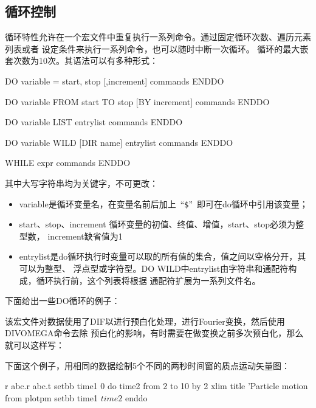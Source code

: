 \subsection{循环控制}
循环特性允许在一个宏文件中重复执行一系列命令。通过固定循环次数、遍历元素列表或者
设定条件来执行一系列命令，也可以随时中断一次循环。
循环的最大嵌套次数为10次。其语法可以有多种形式：
\begin{SACCode}
DO variable = start, stop [,increment]
    commands
ENDDO
\end{SACCode}

\begin{SACCode}
DO variable FROM start TO stop [BY increment]
    commands
ENDDO
\end{SACCode}

\begin{SACCode}
DO variable LIST entrylist
    commands
ENDDO
\end{SACCode}

\begin{SACCode}
DO variable WILD [DIR name] entrylist
    commands
ENDDO
\end{SACCode}

\begin{SACCode}
WHILE expr
    commands
ENDDO
\end{SACCode}
其中大写字符串均为关键字，不可更改：
\begin{itemize}
\item variable是循环变量名，在变量名前后加上~``\lstinline{$}''~即可在do循环中引用该变量；
\item start、stop、increment 循环变量的初值、终值、增值，start、stop必须为整型数，
    increment缺省值为1
\item entrylist是do循环执行时变量可以取的所有值的集合，值之间以空格分开，其可以为整型、
  浮点型或字符型。DO WILD中entrylist由字符串和通配符构成，循环执行前，这个列表将根据
  通配符扩展为一系列文件名。
\end{itemize}

下面给出一些DO循环的例子：

该宏文件对数据使用了DIF以进行预白化处理，进行Fourier变换，然后使用DIVOMEGA命令去除
预白化的影响，有时需要在做变换之前多次预白化，那么就可以这样写：

下面这个例子，用相同的数据绘制5个不同的两秒时间窗的质点运动矢量图：
\begin{SACCode}
r abc.r abc.t
setbb time1 0
do time2 from 2 to 10 by 2
    xlim %
    title 'Particle motion from %
    plotpm
    setbb time1 $time2$
enddo 
\end{SACCode}

